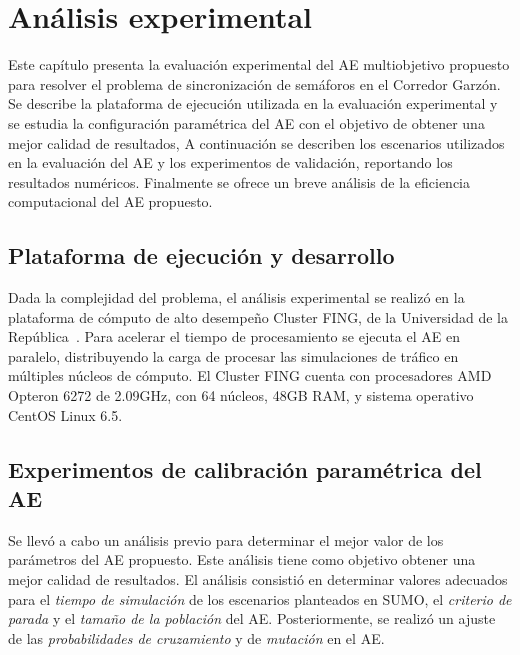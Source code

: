 \chapter{Análisis experimental}
Este capítulo presenta la evaluación experimental del AE multiobjetivo propuesto para resolver el problema de sincronización de semáforos en el Corredor Garzón. Se describe la plataforma de ejecución utilizada en la evaluación experimental y se estudia la configuración paramétrica del AE con el objetivo de obtener una mejor calidad de resultados, A continuación se describen los escenarios utilizados en la evaluación del AE y  los experimentos de validación, reportando los resultados numéricos. Finalmente se ofrece un breve análisis de la eficiencia computacional del AE propuesto.


\section{Plataforma de ejecución y desarrollo}

Dada la complejidad del problema, el análisis experimental se realizó en la plataforma de cómputo de alto desempeño Cluster FING, de la Universidad de la República~\citep{nesmachnow2010computacion}. Para acelerar el tiempo de procesamiento se ejecuta el AE en paralelo, distribuyendo la carga de procesar las simulaciones de tráfico en múltiples núcleos de cómputo. El Cluster FING cuenta con procesadores AMD Opteron 6272 de 2.09GHz, con 64 núcleos, 48GB RAM, y sistema operativo CentOS Linux 6.5.



\section{Experimentos de calibración paramétrica del AE}
Se llevó a cabo un análisis previo para determinar el mejor valor de los parámetros del AE propuesto. Este análisis tiene como objetivo obtener una mejor calidad de resultados. El análisis consistió en determinar valores adecuados para el \emph{tiempo de simulación} de los escenarios planteados en SUMO, el \emph{criterio de parada} y el \emph{tamaño de la población} del AE. Posteriormente, se realizó un ajuste de las \emph{probabilidades de cruzamiento} y de \emph{mutación} en el AE. 

